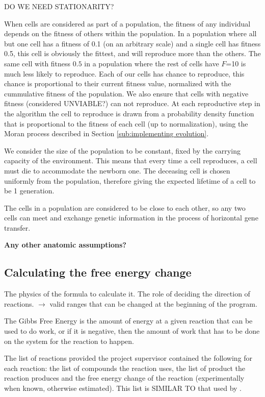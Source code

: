\documentclass[10pt,a4paper]{article}
\begin{document}
	DO WE NEED STATIONARITY?

	When cells are considered as part of a population, the fitness of any individual depends on the fitness of others within the population. In a population where all but one cell has a fitness of 0.1 (on an arbitrary scale) and a single cell has fitness 0.5, this cell is obviously the fittest, and will reproduce more than the others. The same cell with fitness $0.5$ in a population where the rest of cells have $F$=10 is much less likely to reproduce. Each of our cells has chance to reproduce, this chance is proportional to their current fitness value, normalized with the cummulative fitness of the population. We also ensure that cells with negative fitness (considered UNVIABLE?) can not reproduce. At each reproductive step in the algorithm the cell to reproduce is drawn from a probability density function that is proportional to the fitness of each cell (up to normalization), using the Moran process described in Section \ref{sub:implementing evolution}.


	We consider the size of the population to be constant, fixed by the carrying capacity of the environment. This means that every time a cell reproduces, a cell must die to accommodate the newborn one. The deceasing cell is chosen uniformly from the population, therefore giving the expected lifetime of a cell to be 1 generation.

	The cells in a population are considered to be close to each other, so  any two cells can meet and exchange genetic information in the process of horizontal gene transfer.

	\textbf{Any other anatomic assumptions?}

\subsection{Calculating the free energy change}
\label{sub:The free energy change}
The physics of the formula to calculate it. The role of deciding the direction of reactions.  $\rightarrow$ valid ranges  that can be changed at the beginning of the program.

	The Gibbs Free Energy is the amount of energy at a given reaction that can be used to do work, or if it is negative, then the amount of work that has to be done on the system for the reaction to happen. 


	The list of reactions provided the project supervisor contained the following for each reaction: the list of compounds the reaction uses, the list of product the reaction produces and the free energy change of the reaction (experimentally when known, otherwise estimated). This list is SIMILAR TO that used by \cite{BartekLower}.
	
\end{document}
